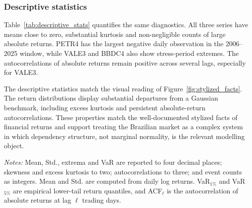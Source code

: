 \subsubsection{Descriptive statistics}

Table~\ref{tab:descriptive_stats} quantifies the same diagnostics. All three series have means close to zero, substantial kurtosis and non-negligible counts of large absolute returns. PETR4 has the largest negative daily observation in the 2006--2025 window, while VALE3 and BBDC4 also show stress-period extremes. The autocorrelations of absolute returns remain positive across several lags, especially for VALE3.

The descriptive statistics match the visual reading of Figure~\ref{fig:stylized_facts}. The return distributions display substantial departures from a Gaussian benchmark, including excess kurtosis and persistent absolute-return autocorrelations. These properties match the well-documented stylized facts of financial returns \cite{cont_2001_empirical} and support treating the Brazilian market as a complex system in which dependency structure, not marginal normality, is the relevant modelling object.

\begin{center}
\label{tab:descriptive_stats}
\scriptsize
\setlength{\tabcolsep}{2.8pt}
\end{center}

\noindent\footnotesize\emph{Notes:} Mean, Std., extrema and VaR are reported to four decimal places; skewness and excess kurtosis to two; autocorrelations to three; and event counts as integers. Mean and Std. are computed from daily log returns. VaR$_{1\%}$ and VaR$_{5\%}$ are empirical lower-tail return quantiles, and ACF$_\ell$ is the autocorrelation of absolute returns at lag $\ell$ trading days.

